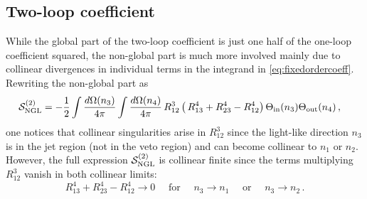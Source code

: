 \documentclass[11pt,a4paper]{article}
\begin{document}
\subsection{Two-loop coefficient}
While the global part of the two-loop coefficient is just one half of the one-loop coefficient squared, the non-global part is much more involved mainly due to collinear divergences in individual terms in the integrand in \eqref{eq:fixedordercoeff}. Rewriting the non-global part as
\begin{align}
\mathcal{S}_{\rm NGL} ^{(2)}
&=-\frac{1}{2}  \int \frac{d\Omega (n_3)}{4\pi}\int \frac{d\Omega (n_4)}{4\pi}\,   R_{12}^{3} \left(\, R_{13}^{4}+ R_{23}^{4} - R_{12}^4 \right)\Theta_{\rm in}(n_3)\Theta_{\rm out}(n_4)\, ,
\end{align} 
one notices that collinear singularities arise in $R_{12}^{3}$ since the light-like direction $n_3$ is in the jet region (not in the veto region) and can become collinear to $n_1$ or $n_2$. However, the full expression $\mathcal{S}_{\rm NGL} ^{(2)}$ is collinear finite since the terms multiplying $R_{12}^{3}$ vanish in both collinear limits:
\begin{equation}
R_{13}^{4}+ R_{23}^{4}- R_{12}^4 \to 0 \quad \text{ for } \quad n_3 \to n_1  \quad \text{ or } \quad n_3 \to n_2\,.
\end{equation}
\end{document}
